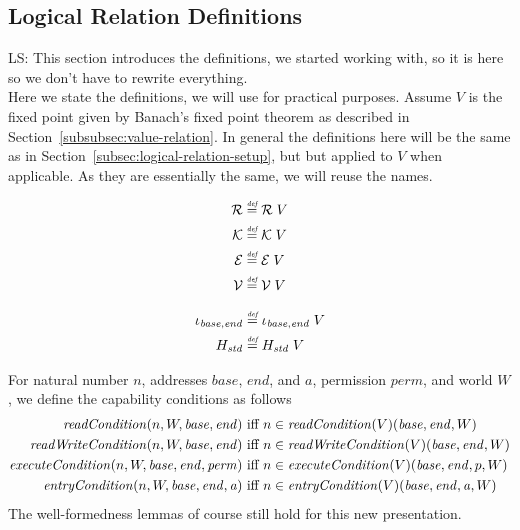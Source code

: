 \documentclass{article}
\newcommand{\defeq}{\stackrel{\textit{\tiny{def}}}{=}}
\newcommand\lau[1]{{\color{purple} \sf \footnotesize {LS: #1}}\\}
\newcommand{\var}[1]{\mathit{#1}}
\newcommand{\addr}{\var{a}}
\newcommand{\start}{\var{base}}
\newcommand{\addrend}{\var{end}}
\newcommand{\perm}{\var{perm}}
\newcommand{\plainfun}[2]{
  \ifthenelse{\equal{#2}{}}
             {\mathit{#1}}
             {\mathit{#1}(#2)}
}
\newcommand{\readCond}[1]{\plainfun{readCondition}{#1}}
\newcommand{\writeCond}[1]{\plainfun{readWriteCondition}{#1}}
\newcommand{\execCond}[1]{\plainfun{executeCondition}{#1}}
\newcommand{\entryCond}[1]{\plainfun{entryCondition}{#1}}
\newcommand{\asmType}{\plaindom{AsmType}}
\newcommand{\plaindom}[1]{\mathrm{#1}}
\newcommand{\intr}[2]{\mathcal{#1}}
\newcommand{\valueintr}[1]{\intr{V}{#1}}
\newcommand{\exprintr}[1]{\intr{E}{#1}}
\newcommand{\contintr}[1]{\intr{K}{#1}}
\newcommand{\regintr}[1]{\intr{R}{#1}}
\newcommand{\stdvr}{\valueintr{\asmType}}
\newcommand{\stder}{\exprintr{\asmType}}
\newcommand{\stdrr}{\regintr{\asmType}}
\newcommand{\stdkr}{\contintr{\asmType}}
\begin{document}
\subsection{Logical Relation Definitions}
\label{subsec:logical-relation-definitions}
\lau{This section introduces the definitions, we started working with, so it is here so we don't have to rewrite everything.}
Here we state the definitions, we will use for practical purposes.  Assume $V$ is the fixed point given by Banach's fixed point theorem as described in Section~\ref{subsubsec:value-relation}. In general the definitions here will be the same as in Section~\ref{subsec:logical-relation-setup}, but but applied to $V$ when applicable. As they are essentially the same, we will reuse the names.

\begin{align*}
  \stdrr & \defeq \stdrr \; V \\
  \stdkr & \defeq \stdkr \; V \\
  \stder & \defeq \stder \; V \\
  \stdvr & \defeq \stdvr \; V 
\end{align*}

\begin{align*}
  \iota_{\start,\addrend} & \defeq \iota_{\start,\addrend} \; V \\
  H_{\var{std}}          & \defeq H_{\var{std}} \; V
\end{align*}

For natural number $n$, addresses $\start$, $\addrend$, and $\addr$, permission $\perm$, and world $W$, we define the capability conditions as follows
\begin{align*}
  \readCond{n,W,\start,\addrend}        & \text{ iff } n \in \readCond{}(V)(\start,\addrend,W)\\
  \writeCond{n,W,\start,\addrend}       & \text{ iff } n \in \writeCond{}(V)(\start,\addrend,W)\\
  \execCond{n,W,\start,\addrend,\perm}  & \text{ iff } n \in \execCond{}(V)(\start,\addrend,p,W)\\
  \entryCond{n,W,\start,\addrend,\addr} & \text{ iff } n \in \entryCond{}(V)(\start,\addrend,\addr,W)
\end{align*}
The well-formedness lemmas of course still hold for this new presentation.
\end{document}

